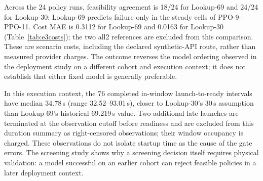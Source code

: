 Across the 24 policy runs, feasibility agreement is 18/24 for Lookup-69 and
24/24 for Lookup-30: Lookup-69 predicts failure only in the steady cells of PPO-9--PPO-11.
Cost MAE is 0.3112 for Lookup-69 and 0.0163 for Lookup-30
(Table~\ref{tab:e3costs}); the two all2 references are excluded from this
comparison. These are scenario costs, including the declared synthetic-API
route, rather than measured provider charges. The outcome reverses the
model ordering observed in the deployment study on a different cohort and execution context;
it does not establish that either fixed model is generally preferable.

In this execution context, the 76 completed in-window launch-to-ready
intervals have median 34.78\,s
(range 32.52--93.01\,s), closer to Lookup-30's 30\,s assumption than Lookup-69's historical
69.219\,s value. Two additional late launches are terminated at the
observation cutoff before readiness and are excluded from this duration
summary as right-censored observations; their window occupancy is charged.
These observations do not isolate startup time as the cause of the gate
errors. The screening study shows why a screening decision itself requires physical
validation: a model successful on an earlier cohort can reject feasible
policies in a later deployment context.
